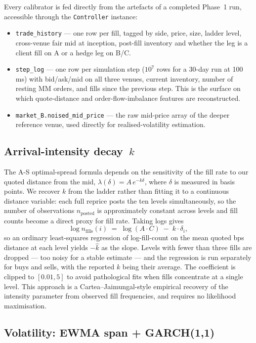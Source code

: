 Every calibrator is fed directly from the artefacts of a completed
Phase~1 run, accessible through the \texttt{Controller} instance:

\begin{itemize}\itemsep2pt
\item \texttt{trade\_history} --- one row per fill, tagged by side,
price, size, ladder level, cross-venue fair mid at inception, post-fill
inventory and whether the leg is a client fill on A or a hedge leg on
B/C.
\item \texttt{step\_log} --- one row per simulation step (\(10^7\)
rows for a 30-day run at 100\,ms) with bid/ask/mid on all three venues,
current inventory, number of resting MM orders, and fills since the
previous step. This is the surface on which quote-distance and
order-flow-imbalance features are reconstructed.
\item \texttt{market\_B.noised\_mid\_price} --- the raw mid-price array
of the deeper reference venue, used directly for realised-volatility
estimation.
\end{itemize}

\subsection{Arrival-intensity decay~$k$}

The A-S optimal-spread formula depends on the sensitivity of the
fill rate to our quoted distance from the mid,
\(\lambda(\delta) = A\,e^{-k\delta}\), where $\delta$ is measured in
basis points. We recover $k$ from the ladder rather than fitting it
to a continuous distance variable: each full reprice posts the ten
levels simultaneously, so the number of observations $n_{\text{posted}}$
is approximately constant across levels and fill counts become a
direct proxy for fill rate. Taking logs gives
\[
\log n_{\text{fills}}(i) \;=\; \log(A \cdot C) \;-\; k \cdot \delta_i,
\]
so an ordinary least-squares regression of log-fill-count on the
mean quoted bps distance at each level yields $-\hat k$ as the slope.
Levels with fewer than three fills are dropped --- too noisy for a
stable estimate --- and the regression is run separately for buys
and sells, with the reported $k$ being their average. The
coefficient is clipped to $[0.01, 5]$ to avoid pathological fits
when fills concentrate at a single level. This approach is a
Cartea--Jaimungal-style empirical recovery of the intensity
parameter from observed fill frequencies, and requires no
likelihood maximisation.

\subsection{Volatility: EWMA span + GARCH(1,1)}

